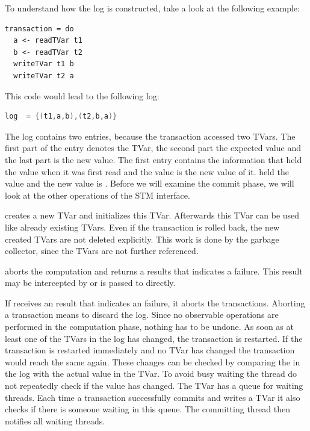 To understand how the log is constructed, take a look at the following example:
\begin{lstlisting}
transaction = do
  a <- readTVar t1
  b <- readTVar t2
  writeTVar t1 b
  writeTVar t2 a
\end{lstlisting}
This code would lead to the following log:
\begin{lstlisting}[language=C]
 log  = {(t1,a,b),(t2,b,a)} 
\end{lstlisting}
The log contains two entries, because the transaction accessed two TVars. The first part of the entry denotes the TVar, the second
part the expected value and the last part is the new value. The first entry contains the information that 
held the value  when it was first read and the value  is the new value of it.  held the value  
and the new value is . Before we will examine the commit phase, we will look at the other operations of the STM interface.

 creates a new TVar and initializes this TVar. Afterwards this TVar can be used like already existing TVars.
Even if the transaction is rolled back, the new created TVars are not deleted explicitly. This work is done by the garbage
collector, since the TVars are not further referenced. 

 aborts the computation and returns a results that indicates a failure. This result may be intercepted by 
 or is passed to  directly. 

If  receives an result that indicates an failure, it aborts the transactions. 
Aborting a transaction means to discard the log. Since no observable operations are performed in the computation phase, nothing has to be undone. 
As soon as at least one of the TVars in the log has changed, the transaction is restarted. If the transaction is restarted immediately and no 
TVar has changed the transaction would reach the same  again. These changes can be checked by comparing the  in
the log with the actual value in the TVar. To avoid busy waiting the thread do not repeatedly check if the value has changed. The TVar has a 
queue for waiting threads. Each time a transaction successfully commits and writes a TVar it also checks if there is someone waiting in 
this queue. The committing thread then notifies all waiting threads.

